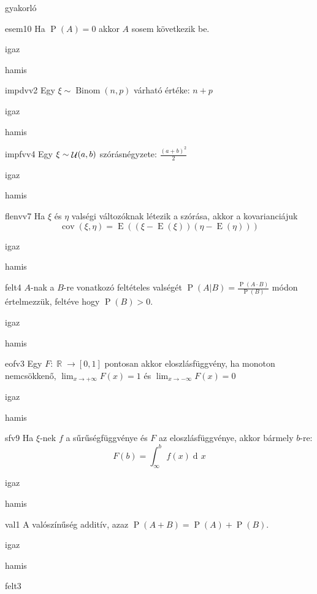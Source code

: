 \documentclass[12pt]{article}
\DeclareMathOperator{\Binom}{Binom}
\DeclareMathOperator{\E}{E}
\renewcommand{\P}{\operatorname{P}}
\renewcommand{\d}{\operatorname{d\! }} %
\DeclareMathOperator{\R}{\mathbb{R}}
\DeclareMathOperator{\Unif}{{\cal U}}
\DeclareMathOperator{\cov}{cov}
\begin{document}
\begin{quiz}{gyakorló}

\begin{multi}{esem10}
Ha $\P(A)=0$ akkor $A$ sosem következik be.
\item igaz
\item* hamis
\end{multi}
\begin{multi}{impdvv2}
Egy $\xi\sim \Binom(n,p)$ várható értéke: $n+p$
\item igaz
\item* hamis
\end{multi}
\begin{multi}{impfvv4}
Egy $\xi\sim \Unif(a,b)$ szórásnégyzete: $\frac{(a+b)^2}{2}$
\item igaz
\item* hamis
\end{multi}
\begin{multi}{flenvv7}
Ha $\xi$ és $\eta$ valségi változóknak létezik a szórása, akkor a 
kovarianciájuk
$$
\cov(\xi,\eta)=\E((\xi-\E(\xi))(\eta-\E(\eta)))
$$
\item* igaz
\item hamis
\end{multi}
\begin{multi}{felt4}
$A$-nak a $B$-re vonatkozó feltételes valségét $\P(A|B)=\frac{\P(A\cdot B)}{\P(B)}$ módon értelmezzük, feltéve hogy $\P(B)>0$.
\item* igaz
\item hamis
\end{multi}
\begin{multi}{eofv3}
Egy $F:\R\to [0,1]$ pontosan akkor eloszlásfüggvény, ha monoton nemcsökkenő, 
$\lim_{x\to+\infty}F(x)=1$ és $\lim_{x\to-\infty}F(x)=0$
\item igaz
\item* hamis
\end{multi}
\begin{multi}{sfv9}
Ha $\xi$-nek $f$ a sűrűségfüggvénye és $F$ az eloszlásfüggvénye, akkor bármely $b$-re:
$$
F(b)=\int_{\infty}^{b}f(x)\d x
$$
\item* igaz
\item hamis
\end{multi}
\begin{multi}{val1}
A valószínűség additív, azaz $\P(A+B)=\P(A)+\P(B)$.
\item igaz
\item* hamis
\end{multi}
\begin{multi}{felt3}

\end{multi}
\end{quiz}
\end{document}
